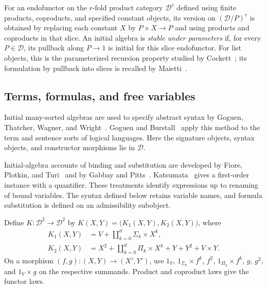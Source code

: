 \documentclass[11pt]{article}
\theoremstyle{definition}\newtheorem{definition}[theorem]{Definition}
\begin{document}
For an endofunctor on the $r$-fold product category $\mathcal D^r$
defined using finite products, coproducts, and specified constant objects, its version on
$(\mathcal D/P)^r$ is obtained
by replacing each constant $X$ by $P\times X\to P$ and using
products and coproducts in that slice. An initial algebra is
\emph{stable under parameters} if, for every $P\in\mathcal D$,
its pullback along $P\to1$ is initial for this slice endofunctor.
For list objects, this is the parameterized recursion property studied by
Cockett~\cite{CockettLists}; its formulation by pullback into slices is
recalled by Maietti~\cite[Definition 2.4 and the following paragraph]{MaiettiLists}.

\subsection{Terms, formulas, and free variables}
\label{app:first-order-syntax}

Initial many-sorted algebras are used to specify abstract syntax by
Goguen, Thatcher, Wagner, and Wright~\cite[Section 2]{GTWW}.
Goguen and Burstall~\cite[Section 4]{GoguenBurstall} apply this method
to the term and sentence sorts of logical languages.
Here the signature objects, syntax objects, and constructor morphisms
lie in $\mathcal D$.

Initial-algebra accounts of binding and substitution are developed by
Fiore, Plotkin, and Turi~\cite[Sections 2--4]{FPT} and by
Gabbay and Pitts~\cite[Section 6]{GabbayPitts}.
Katsumata~\cite[Section 2, Example 1(3)]{Katsumata} gives a first-order
instance with a quantifier. These treatments identify expressions up to
renaming of bound variables. The syntax defined below retains variable
names, and formula substitution is defined on an admissibility subobject.

Define $K:\mathcal D^2\to\mathcal D^2$ by
$K(X,Y)=\bigl(K_1(X,Y),K_2(X,Y)\bigr)$, where
\begin{align}
 K_1(X,Y)&=V+\coprod_{k=0}^{d}\Sigma_k\times X^k,
                                                        \label{eq:term-functor}\\
 K_2(X,Y)&=X^2+\coprod_{k=0}^{d}\Pi_k\times X^k
                  +Y+Y^2+V\times Y.                    \label{eq:formula-functor}
\end{align}
On a morphism $(f,g):(X,Y)\to(X',Y')$, use
$1_V$, $1_{\Sigma_k}\times f^k$, $f^2$,
$1_{\Pi_k}\times f^k$, $g$, $g^2$, and $1_V\times g$ on
the respective summands. Product and coproduct laws give the
functor laws.
\end{document}
